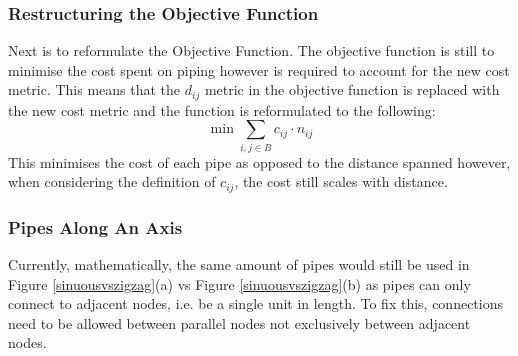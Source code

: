 \subsubsection{Restructuring the Objective Function}\label{finalobjfunc}
Next is to reformulate the Objective Function. The objective function is still to minimise the cost spent on piping however is required to account for the new cost metric. This means that the $d_{ij}$ metric in the objective function is replaced with the new cost metric and the function is reformulated to the following:
\[
\min\sum_{i,j\in B}c_{ij}\cdot n_{ij}
\]
This minimises the cost of each pipe as opposed to the distance spanned however, when considering the definition of $c_{ij}$, the cost still scales with distance.

\subsubsection{Pipes Along An Axis}
Currently, mathematically, the same amount of pipes would still be used in Figure \ref{sinuousvszigzag}(a) vs Figure \ref{sinuousvszigzag}(b) as pipes can only connect to adjacent nodes, i.e. be a single unit in length. To fix this, connections need to be allowed between parallel nodes not exclusively between adjacent nodes.

